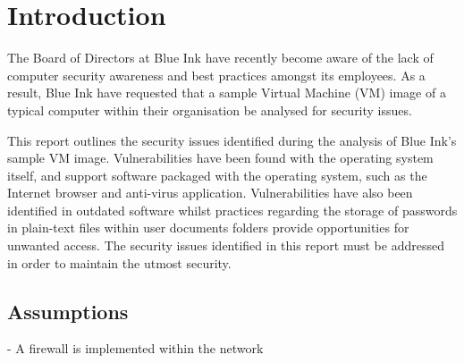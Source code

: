 \section{Introduction}

The Board of Directors at Blue Ink have recently become aware of the lack of computer security awareness and best practices amongst its employees. As a result, Blue Ink have requested that a sample Virtual Machine (VM) image of a typical computer within their organisation be analysed for security issues.

This report outlines the security issues identified during the analysis of Blue Ink's sample VM image. Vulnerabilities have been found with the operating system itself, and support software packaged with the operating system, such as the Internet browser and anti-virus application. Vulnerabilities have also been identified in outdated software whilst practices regarding the storage of passwords in plain-text files within user documents folders provide opportunities for unwanted access. The security issues identified in this report must be addressed in order to maintain the utmost security.

\subsection{Assumptions}

- A firewall is implemented within the network